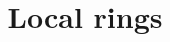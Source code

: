 \documentclass{ximera}
\title{Local rings}
\begin{document}
\begin{abstract}

\end{abstract}
\maketitle

\end{document}
